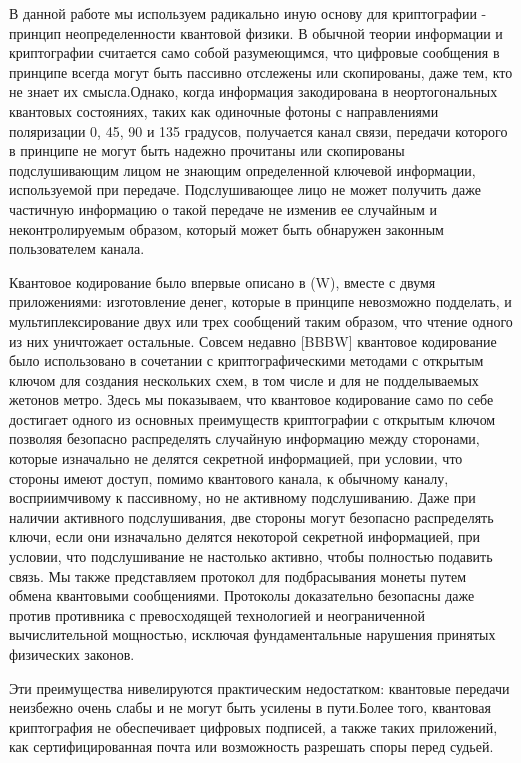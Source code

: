 ­­­­В данной работе мы используем радикально иную основу для криптографии - принцип неопределенности квантовой физики. В обычной теории информации и криптографии считается само собой разумеющимся, что цифровые сообщения в принципе всегда могут быть пассивно отслежены или скопированы, даже тем, кто не знает их смысла.Однако, когда информация закодирована в неортогональных квантовых состояниях, таких как одиночные фотоны с направлениями поляризации 0, 45, 90 и 135 градусов, получается канал связи, передачи которого в принципе не могут быть надежно прочитаны или скопированы подслушивающим лицом не знающим определенной ключевой информации, используемой при передаче. Подслушивающее лицо не может получить даже частичную информацию о такой передаче не изменив ее случайным и неконтролируемым образом, который может быть обнаружен законным пользователем канала.

­­­­­­Квантовое кодирование было впервые описано в (W), вместе с двумя приложениями: изготовление денег, которые в принципе невозможно подделать, и мультиплексирование двух или трех сообщений таким образом, что чтение одного из них уничтожает остальные. Совсем недавно [BBBW] квантовое кодирование было использовано в сочетании с криптографическими методами с открытым ключом для создания нескольких схем, в том числе и для не подделываемых жетонов метро. Здесь мы показываем, что квантовое кодирование само по себе достигает одного из основных преимуществ криптографии с открытым ключом позволяя безопасно распределять случайную информацию между сторонами, которые изначально не делятся секретной информацией, при условии, что стороны имеют доступ, помимо квантового канала, к обычному каналу, восприимчивому к пассивному, но не активному подслушиванию. Даже при наличии активного подслушивания, две стороны могут безопасно распределять ключи, если они изначально делятся некоторой секретной информацией, при условии, что подслушивание не настолько активно, чтобы полностью подавить связь. Мы также представляем протокол для подбрасывания монеты путем обмена квантовыми сообщениями. Протоколы доказательно безопасны даже против противника с превосходящей технологией и неограниченной вычислительной мощностью, исключая фундаментальные нарушения принятых физических законов.

­­Эти преимущества нивелируются практическим недостатком: квантовые передачи неизбежно очень слабы и не могут быть усилены в пути.Более того, квантовая криптография не обеспечивает цифровых подписей, а также таких приложений, как сертифицированная почта или возможность разрешать споры перед судьей.

